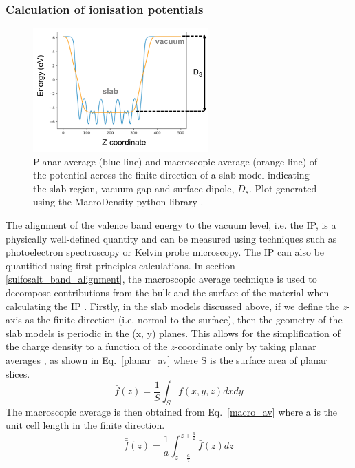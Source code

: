 \documentclass[11pt, twoside]{report}
\begin{document}
\subsubsection{Calculation of ionisation potentials}

\begin{figure}[h!]
  \centering
    \includegraphics[width=0.6\textwidth]{figures/MD_eg.png}
    \caption[Planar average (blue line) and macroscopic average (orange line) of the potential across the finite direction of a slab model indicating the slab region, vacuum gap and surface dipole, $D_s$.]{Planar average (blue line) and macroscopic average (orange line) of the potential across the finite direction of a slab model indicating the slab region, vacuum gap and surface dipole, $D_s$. Plot generated using the MacroDensity python library \cite{MacroDensity}.}
  \label{MD_eg}
\end{figure}

The alignment of the valence band energy to the vacuum level, i.e. the IP, is a physically well-defined quantity and can be measured using techniques such as photoelectron spectroscopy or Kelvin probe microscopy. The IP can also be quantified using first-principles calculations. In section \ref{sulfosalt_band_alignment}, the macroscopic average technique is used to decompose contributions from the bulk and the surface of the material when calculating the IP \cite{macro_pot_IP}.
Firstly, in the slab models discussed above, if we define the \textit{z}-axis as the finite direction (i.e. normal to the surface), then the geometry of the slab models is periodic in the (x, y) planes. This allows for the simplification of the charge density to a function of the \textit{z}-coordinate only by taking planar averages \cite{band_engineering}, as shown in Eq.~\ref{planar_av} where S is the surface area of planar slices.
\begin{equation}\label{planar_av}
\bar{f}(z) = \frac{1}{S}\int_S f(x,y,z)dxdy
\end{equation}
The macroscopic average is then obtained from Eq.~\ref{macro_av} where a is the unit cell length in the finite direction.
\begin{equation}\label{macro_av}
\bar{\bar{f}}(z) = \frac{1}{a} \int_{z-\frac{a}{2}}^{z+\frac{a}{2}}  \bar{f}(z) dz
\end{equation}
\end{document}
